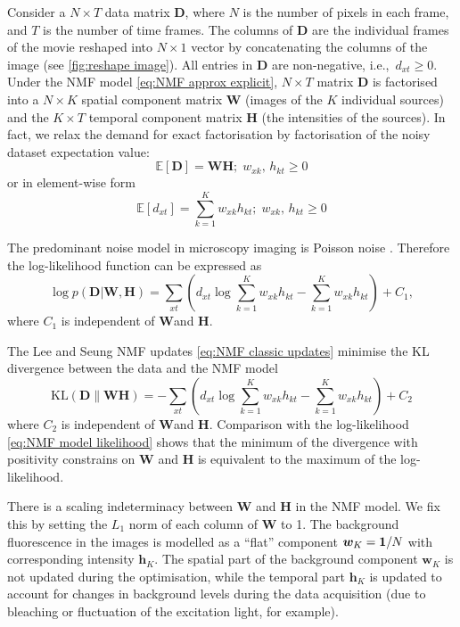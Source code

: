 Consider a $N\times T$ data matrix $\bm{D}$, where $N$ is the number of pixels in each frame, and $T$ is the number of time frames. The columns of $\bm{D}$ are the individual frames of the movie reshaped into $N\times 1$ vector by concatenating the columns of the image (see \autoref{fig:reshape image}). All entries in $\bm{D}$ are non-negative, i.e.,\ $d_{xt}\geq 0$. Under the NMF model \autoref{eq:NMF approx explicit}, $N\times T$ matrix $\bm{D}$ is factorised into a $N\times K$ spatial component matrix $\bm{W}$ (images of the $K$ individual sources) and the $K\times T$ temporal component matrix $\bm{H}$ (the intensities of the sources). In fact, we relax the demand for exact factorisation by factorisation of the noisy dataset expectation value:  
%
\begin{equation}
	\mathbb{E}\left[\bm{D}\right]=\bm{WH};\;w_{xk},\, h_{kt}\geq0
	\label{eq:NMF model}
\end{equation}
%
or in element-wise form
%
\begin{equation}
	\mathbb{E}\left[d_{xt}\right]=\sum_{k=1}^K w_{xk}h_{kt};\;w_{xk},\, h_{kt}\geq0
	\label{eq:NMF model element-wise}
\end{equation}

The predominant noise model in microscopy imaging is Poisson noise \cite{PawleyHandbook2006}. Therefore the log-likelihood function can be expressed as
%
\begin{equation}
	\log p(\bm{D}|\bm{W},\bm{H})=\sum_{xt}\left(d_{xt}\log\sum_{k=1}^K w_{xk}h_{kt}-\sum_{k=1}^K w_{xk}h_{kt}\right)+C_1,
	\label{eq:NMF model likelihood}
\end{equation}
%
where $C_1$ is independent of $\bm{W}$and $\bm{H}$. 

The Lee and Seung NMF updates \autoref{eq:NMF classic updates} minimise the KL divergence between the data and the NMF model
%
\begin{equation}
	\mbox{KL}(\bm{D}\parallel\bm{WH})=-\sum_{xt}\left(d_{xt}\log\sum_{k=1}^K w_{xk}h_{kt}-\sum_{k=1}^K w_{xk}h_{kt}\right)+C_2
	\label{eq:KL divergence}
\end{equation}
%
where $C_2$ is independent of $\bm{W}$and $\bm{H}$. Comparison with the log-likelihood \autoref{eq:NMF model likelihood} shows that the minimum of the divergence with positivity constrains on $\bm{W}$ and $\bm{H}$ is equivalent to the maximum of the log-likelihood. 

There is a scaling indeterminacy between $\bm{W}$ and $\bm{H}$ in the NMF model. We fix this by setting the $L_1$ norm of each column of $\bm{W}$ to 1. The background fluorescence in the images is modelled as a ``flat'' component $\bm{w}_K = \mathbf{1}/N$ with corresponding intensity $\bm{h}_K$. The spatial part of the background component $\bm{w}_K$ is not updated during the optimisation, while the temporal part $\bm{h}_K$ is updated to account for changes in background levels during the data acquisition (due to bleaching or fluctuation of the excitation light, for example).

